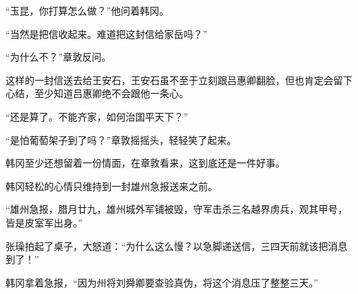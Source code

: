 “玉昆，你打算怎么做？”他问着韩冈。

“当然是把信收起来。难道把这封信给家岳吗？”

“为什么不？”章敦反问。

这样的一封信送去给王安石，王安石虽不至于立刻跟吕惠卿翻脸，但也肯定会留下心结，至少知道吕惠卿绝不会跟他一条心。

“还是算了。不能齐家，如何治国平天下？”

“是怕葡萄架子到了吗？”章敦摇摇头，轻轻笑了起来。

韩冈至少还想留着一份情面，在章敦看来，这到底还是一件好事。

韩冈轻松的心情只维持到一封雄州急报送来之前。

“雄州急报，腊月廿九，雄州城外军铺被毁，守军击杀三名越界虏兵，观其甲号，皆是皮室军出身。”

张璪拍起了桌子，大怒道：“为什么这么慢？以急脚递送信，三四天前就该把消息到了！”

韩冈拿着急报，“因为州将刘舜卿要查验真伪，将这个消息压了整整三天。”
